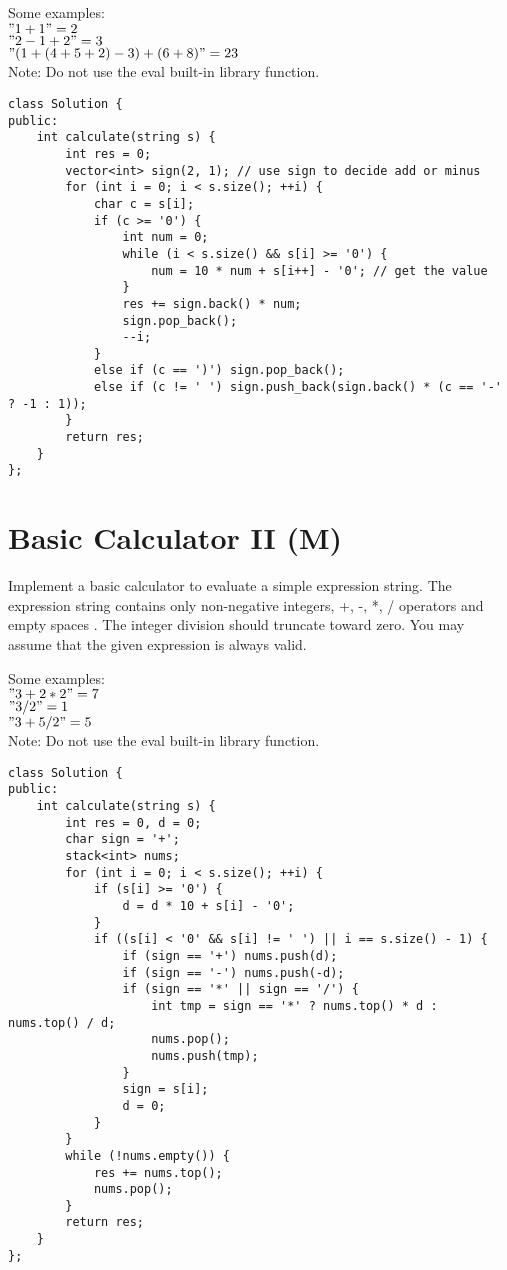 Some examples:\\
$"1 + 1" = 2$\\
$" 2-1 + 2 " = 3$\\
$"(1+(4+5+2)-3)+(6+8)" = 23$\\

Note: Do not use the eval built-in library function. \\

\begin{lstlisting}
class Solution {
public:
    int calculate(string s) {
        int res = 0;
        vector<int> sign(2, 1); // use sign to decide add or minus
        for (int i = 0; i < s.size(); ++i) {
            char c = s[i];
            if (c >= '0') {
                int num = 0;
                while (i < s.size() && s[i] >= '0') {
                    num = 10 * num + s[i++] - '0'; // get the value
                }
                res += sign.back() * num;
                sign.pop_back();
                --i;
            }
            else if (c == ')') sign.pop_back();
            else if (c != ' ') sign.push_back(sign.back() * (c == '-' ? -1 : 1));
        }
        return res;
    }
};
\end{lstlisting}


\section{Basic Calculator II (M)}
Implement a basic calculator to evaluate a simple expression string. The expression string contains only non-negative integers, +, -, *, / operators and empty spaces . The integer division should truncate toward zero. You may assume that the given expression is always valid.

Some examples:\\
$"3+2*2" = 7$\\
$" 3/2 " = 1$\\
$" 3+5 / 2 " = 5$\\

Note: Do not use the eval built-in library function. \\

\begin{lstlisting}
class Solution {
public:
    int calculate(string s) {
        int res = 0, d = 0;
        char sign = '+';
        stack<int> nums;
        for (int i = 0; i < s.size(); ++i) {
            if (s[i] >= '0') {
                d = d * 10 + s[i] - '0';
            }
            if ((s[i] < '0' && s[i] != ' ') || i == s.size() - 1) {
                if (sign == '+') nums.push(d);
                if (sign == '-') nums.push(-d);
                if (sign == '*' || sign == '/') {
                    int tmp = sign == '*' ? nums.top() * d : nums.top() / d;
                    nums.pop();
                    nums.push(tmp);
                }
                sign = s[i];
                d = 0;
            } 
        }
        while (!nums.empty()) {
            res += nums.top();
            nums.pop();
        }
        return res;
    }
};
\end{lstlisting}

